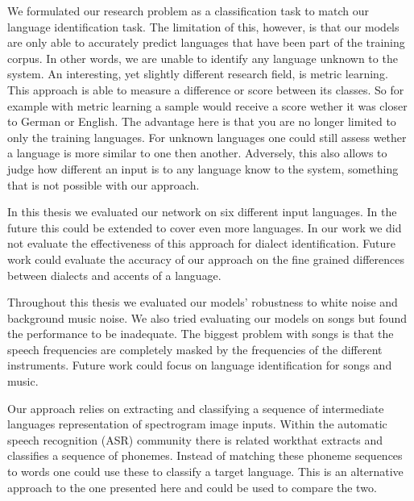We formulated our research problem as a classification task to match our language identification task. The limitation of this, however, is that our models are only able to accurately predict languages that have been part of the training corpus. In other words, we are unable to identify any language unknown to the system. An interesting, yet slightly different research field, is metric learning. This approach is able to measure a difference or score between its classes. So for example with metric learning a sample would receive a score wether it was closer to German or English. The advantage here is that you are no longer limited to only the training languages. For unknown languages one could still assess wether a language is more similar to one then another. Adversely, this also allows to judge how different an input is to any language know to the system, something that is not possible with our approach.

In this thesis we evaluated our network on six different input languages. In the future this could be extended to cover even more languages. In our work we did not evaluate the effectiveness of this approach for dialect identification. Future work could evaluate the accuracy of our approach on the fine grained differences between dialects and accents of a language.

Throughout this thesis we evaluated our models' robustness to white noise and background music noise. We also tried evaluating our models on songs but found the performance to be inadequate. The biggest problem with songs is that the speech frequencies are completely masked by the frequencies of the different instruments. Future work could focus on language identification for songs and music.

Our approach relies on extracting and classifying a sequence of intermediate languages representation of spectrogram image inputs. Within the automatic speech recognition (ASR) community there is related work\cite{song2015end}that extracts and classifies a sequence of phonemes. Instead of matching these phoneme sequences to words one could use these to classify a target language. This is an alternative approach to the one presented here and could be used to compare the two.

